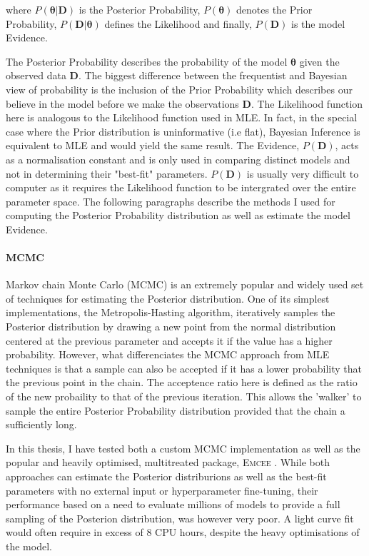 \noindent where $P(\mathbf{\theta}|\mathbf{D})$ is the Posterior Probability, $P(\mathbf{\theta})$ denotes the Prior Probability, $P(\mathbf{D}|\mathbf{\theta})$ defines the Likelihood and finally, $P(\mathbf{D})$ is the model Evidence.

The Posterior Probability describes the probability of the model $\mathbf{\theta}$ given the observed data $\mathbf{D}$. The biggest difference between the frequentist and Bayesian view of probability is the inclusion of the Prior Probability which describes our believe in the model before we make the observations $\textbf{D}$. The Likelihood function here is analogous to the Likelihood function used in MLE. In fact, in the special case where the Prior distribution is uninformative (i.e flat), Bayesian Inference is equivalent to MLE and would yield the same result. The Evidence, $P(\mathbf{D})$, acts as a normalisation constant and is only used in comparing distinct models and not in determining their "best-fit" parameters. $P(\mathbf{D})$ is usually very difficult to computer as it requires the Likelihood function to be intergrated over the entire parameter space. The following paragraphs describe the methods I used for computing the Posterior Probability distribution as well as estimate the model Evidence.

\paragraph{MCMC}
Markov chain Monte Carlo (MCMC) is an extremely popular and widely used set of techniques for estimating the Posterior distribution. One of its simplest implementations, the Metropolis-Hasting algorithm, iteratively samples the Posterior distribution by drawing a new point from the normal distribution centered at the previous parameter and accepts it if the value has a higher probability. However, what differenciates the MCMC approach from MLE techniques is that a sample can also be accepted if it has a lower probability that the previous point in the chain. The acceptence ratio here is defined as the ratio of the new probaility to that of the previous iteration. This allows the 'walker' to sample the entire Posterior Probability distribution provided that the chain a sufficiently long.

In this thesis, I have tested both a custom MCMC implementation as well as the popular and heavily optimised, multitreated package, \textsc{Emcee} \citep{Foreman-Mackey2012}. While both approaches can estimate the Posterior distriburions as well as the best-fit parameters with no external input or hyperparameter fine-tuning, their performance based on a need to evaluate millions of models to provide a full sampling of the Posterion distribution, was however very poor. A light curve fit would often require in excess of 8 CPU hours, despite the heavy optimisations of the model.

